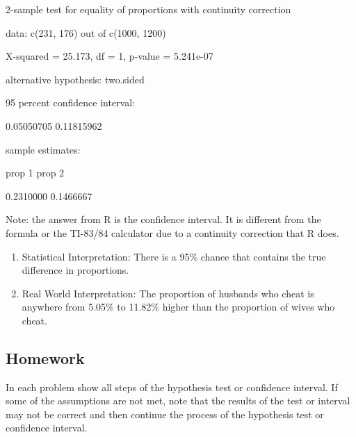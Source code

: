 \documentclass[]{book}
\begin{document}
2-sample test for equality of proportions with continuity correction

data: c(231, 176) out of c(1000, 1200)

X-squared = 25.173, df = 1, p-value = 5.241e-07

alternative hypothesis: two.sided

95 percent confidence interval:

0.05050705 0.11815962

sample estimates:

prop 1 prop 2

0.2310000 0.1466667

Note: the answer from R is the confidence interval. It is different from the formula or the TI-83/84 calculator due to a continuity correction that R does.

\begin{enumerate}
\def\labelenumi{\arabic{enumi}.}
\setcounter{enumi}{3}
\item
  Statistical Interpretation: There is a 95\% chance that contains the true difference in proportions.
\item
  Real World Interpretation: The proportion of husbands who cheat is anywhere from 5.05\% to 11.82\% higher than the proportion of wives who cheat.
\end{enumerate}

\hypertarget{homework-26}{%
\subsection{Homework}\label{homework-26}}

In each problem show all steps of the hypothesis test or confidence interval. If some of the assumptions are not met, note that the results of the test or interval may not be correct and then continue the process of the hypothesis test or confidence interval.
\end{document}

